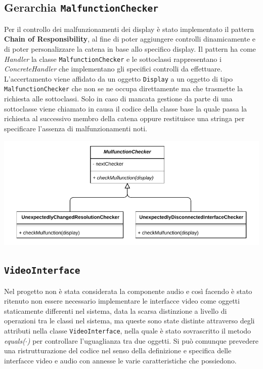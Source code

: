 \documentclass[a4paper,11pt]{article}
\begin{document}
	\subsection{Gerarchia \texttt{MalfunctionChecker}}
	Per il controllo dei malfunzionamenti dei display è stato implementato il pattern \textbf{Chain of Responsibility}, al fine di poter aggiungere controlli dinamicamente e di poter personalizzare la catena in base allo specifico display. Il pattern ha come \textit{Handler} la classe \texttt{MalfunctionChecker} e le sottoclassi rappresentano i \textit{ConcreteHandler} che implementano gli specifici controlli da effettuare.\\
	L'accertamento viene affidato da un oggetto \texttt{Display} a un oggetto di tipo \texttt{MalfunctionChecker} che non se ne occupa direttamente ma che trasmette la richiesta alle sottoclassi. Solo in caso di mancata gestione da parte di una sottoclasse viene chiamato in causa il codice della classe base la quale passa la richiesta al successivo membro della catena oppure restituisce una stringa per specificare l'assenza di malfunzionamenti noti.\\
	\begin{minipage}[c]{\textwidth}
		\centering
		\includegraphics[width=.5\textwidth]{diagramma/ClassDiagramm-MalfunctionChecker.pdf}
		\label{fig:malfunction}
	\end{minipage}
	
	\subsection{\texttt{VideoInterface}}
	Nel progetto non è stata considerata la componente audio e così facendo è stato ritenuto non essere necessario implementare le interfacce video come oggetti staticamente differenti nel sistema, data la scarsa distinzione a livello di operazioni tra le classi nel sistema, ma queste sono state distinte attraverso degli attributi nella classe \texttt{VideoInterface}, nella quale è stato sovrascritto il metodo \textit{equals($\cdot$)} per controllare l'uguaglianza tra due oggetti. Si può comunque prevedere una ristrutturazione del codice nel senso della definizione e specifica delle interfacce video e audio con annesse le varie caratteristiche che possiedono.\\
	
\end{document}
